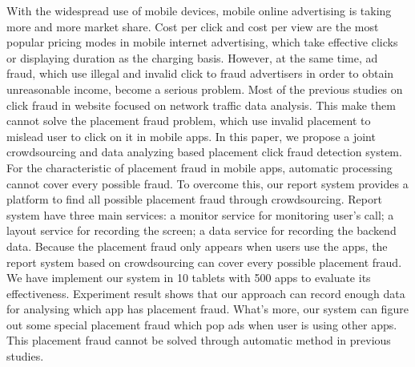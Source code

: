 \begin{englishabstract}

With the widespread use of mobile devices, mobile online advertising is taking more and more market share. Cost per click and cost per view are the most popular pricing modes in mobile internet advertising, which take effective clicks or displaying duration as the charging basis. However, at the same time, ad fraud, which use illegal and invalid click to fraud advertisers in order to obtain unreasonable income, become a serious problem. Most of the previous studies on click fraud in website focused on network traffic data analysis. This make them cannot solve the placement fraud problem, which use invalid placement to mislead user to click on it in mobile apps. In this paper, we propose a joint crowdsourcing and data analyzing based placement click fraud detection system. For the characteristic of placement fraud in mobile apps, automatic processing cannot cover every possible fraud. To overcome this, our report system provides a platform to find all possible placement fraud through crowdsourcing. Report system have three main services: a monitor service for monitoring user's call; a layout service for recording the screen; a data service for recording the backend data. Because the placement fraud only appears when users use the apps, the report system based on crowdsourcing can cover every possible placement fraud. We have implement our system in 10 tablets with 500 apps to evaluate its effectiveness. Experiment result shows that our approach can record enough data for analysing which app has placement fraud. What's more, our system can figure out some special placement fraud which pop ads when user is using other apps. This placement fraud cannot be solved through automatic method in previous studies.

\end{englishabstract}

